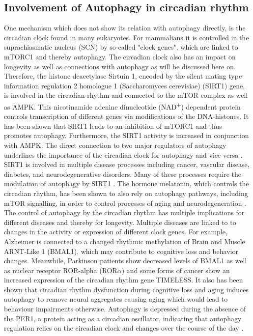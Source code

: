 \documentclass[12pt]{article} %
\begin{document}
\begin{linenumbers*}


\subsection{Involvement of Autophagy in circadian rhythm}
One mechanism which does not show its relation with autophagy directly, is the circadian clock found in many eukaryotes. For mammalians it is controlled in the suprachiasmatic nucleus (SCN) by so-called "clock genes", which are  linked to mTORC1 and thereby autophagy. The circadian clock also has an impact on longevity as well as connections with autophagy as will be discussed here on.
Therefore, the histone deacetylase Sirtuin 1, encoded by the silent mating type information regulation 2 homologue 1 (Saccharomyces cerevisiae) (SIRT1) gene, is involved in the circadian-rhythm and connected to the mTOR complex as well as AMPK. This nicotinamide adenine dinucleotide (NAD\textsuperscript{+}) dependent protein controls transcription of different genes via modifications of the DNA-histones. It has been shown that SIRT1 leads to an inhibition of mTORC1 and thus promotes autophagy. Furthermore, the SIRT1 activity is increased in conjunction with AMPK. The direct connection to two major regulators of autophagy underlines the importance of the circadian clock for autophagy and vice versa
\citep{Maiese2017}.
SIRT1 is involved in multiple disease processes including cancer, vascular disease, diabetes, and neurodegenerative disorders. Many of these processes require the modulation
of autophagy by SIRT1 \citep{Maiese2017}.
The hormone melatonin, which controls the circadian rhythm, has been shown to also rely on autophagy pathways, including mTOR signalling, in order to control processes of aging and neurodegeneration 
\citep{Maiese2017}.
The control of autophagy by the circadian rhythm has multiple implications for different diseases and thereby for longevity. Multiple diseases are linked to to changes in the activity or expression of different clock genes. For example, Alzheimer is connected to a changed rhythmic methylation of Brain and Muscle ARNT-Like 1 (BMAL1), which may contribute to cognitive loss and behavior changes. Meanwhile, Parkinson patients show decreased levels of BMAL1 as well as nuclear receptor ROR-alpha (ROR$\alpha$) and some forms of cancer show an increased expression of the circadian rhythm gene TIMELESS. 
It also has been shown that circadian rhythm dysfunction during cognitive loss and aging induces autophagy to remove neural aggregates causing aging which would lead to behaviour impairments otherwise. 
Autophagy is  depressed during the absence of the PER1, a protein acting as a circadian oscillator, indicating that autophagy regulation relies on the circadian clock and changes over the course of the day
\citep{Maiese2017}.


\end{linenumbers*}
\end{document}
